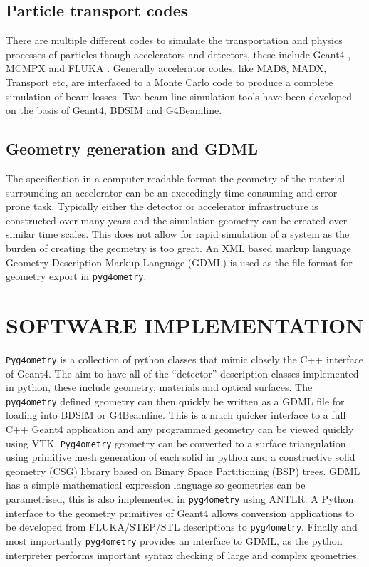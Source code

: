 \documentclass[a4paper,
               keeplastbox,   %
               ]{jacow}
\begin{document}
\subsection{Particle transport codes}
There are multiple different codes to simulate the transportation and physics processes of particles though accelerators and detectors, these include Geant4 \cite{geant4}, MCMPX and FLUKA \cite{fluka}. Generally accelerator codes, like MAD8, MADX, Transport etc, are interfaced to a Monte Carlo code to produce a complete simulation of beam losses. Two beam line simulation tools have been developed on the basis of Geant4, BDSIM and G4Beamline.     

\subsection{Geometry generation and GDML}
The specification in a computer readable format the geometry of the material surrounding an accelerator can be an exceedingly time consuming and error prone task. Typically either the detector or accelerator infrastructure is constructed over many years and the simulation geometry can be created over similar time scales. This does not allow for rapid simulation of a system as the burden of creating the geometry is too great. An XML based markup language Geometry Description Markup Language (GDML) is used as the file format for geometry export in \verb|pyg4ometry|.

\section{SOFTWARE IMPLEMENTATION}
\verb|Pyg4ometry| is a collection of python classes that mimic closely the C++ interface of Geant4. The aim to have all of the ``detector'' description classes implemented in python, these include geometry, materials and optical surfaces. The \verb|pyg4ometry| defined geometry can then quickly be written as a GDML file for loading into BDSIM or G4Beamline. This is a much quicker interface to a full C++ Geant4 application and any programmed geometry can be viewed quickly using VTK. \verb|Pyg4ometry| geometry can be converted to a surface triangulation using primitive mesh generation of each solid in python and a constructive solid geometry (CSG) library based on Binary Space Partitioning (BSP) trees. GDML has a simple mathematical expression language so geometries can be parametrised, this is also implemented in \verb|pyg4ometry| using ANTLR. A Python interface to the geometry primitives of Geant4 allows conversion applications to be developed from FLUKA/STEP/STL descriptions to \verb|pyg4ometry|. Finally and most importantly \verb|pyg4ometry| provides an interface to GDML, as the python interpreter performs important syntax checking of large and complex geometries. 
\end{document}
